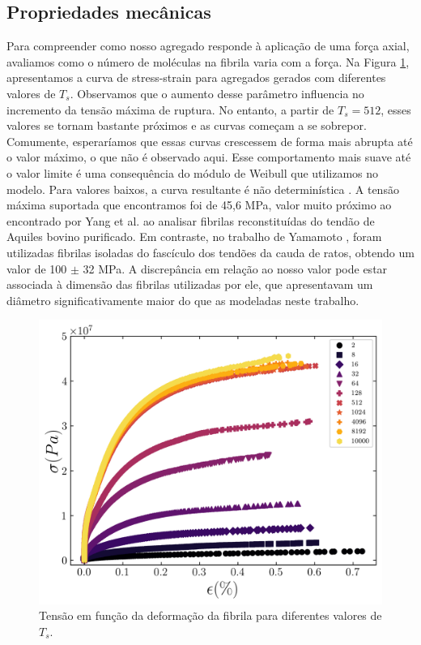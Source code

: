 \documentclass{article}
\begin{document}
    \subsection{Propriedades mecânicas}

    Para compreender como nosso agregado responde à aplicação de uma força axial, avaliamos como o número de 
    moléculas na fibrila varia com a força. Na Figura \ref{R5}, apresentamos a curva de stress-strain para agregados 
    gerados com diferentes valores de \(T_{s}\). Observamos que o aumento desse parâmetro influencia no incremento da 
    tensão máxima de ruptura. No entanto, a partir de \(T_{s} = 512\), esses valores se tornam bastante próximos e as 
    curvas começam a se sobrepor. Comumente, esperaríamos que essas curvas crescessem de forma mais abrupta até o valor
    máximo, o que não é observado aqui. Esse comportamento mais suave até o valor limite é uma consequência do módulo 
    de Weibull que utilizamos no modelo. Para valores baixos, a curva resultante é não determinística 
    \cite{Parkinson1997}. A tensão máxima suportada que encontramos foi de 45,6 MPa, valor muito próximo ao encontrado 
    por Yang et al. \cite{YANG2012148} ao analisar fibrilas reconstituídas do tendão de Aquiles bovino purificado. 
    Em contraste, no trabalho de Yamamoto \cite{Noritaka}, foram utilizadas fibrilas isoladas do fascículo dos tendões 
    da cauda de ratos, obtendo um valor de 100 \(\pm\) 32 MPa. A discrepância em relação ao nosso valor pode estar 
    associada à dimensão das fibrilas utilizadas por ele, que apresentavam um diâmetro significativamente maior do que 
    as modeladas neste trabalho.

    \begin{figure}[H]
        \centering
        \includegraphics[width=\textwidth]{figures/stress_strain.png}

        \caption{Tensão em função da deformação da fibrila para diferentes valores de \(T_{s}\).} 

        \label{R5}
    \end{figure}
\end{document}
